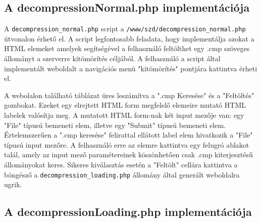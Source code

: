 \documentclass[oneside,titlepage,12pt,a4paper]{report}
\begin{document}
\subsection{A decompressionNormal.php implementációja}

A \texttt{decompression\_normal.php} script a \texttt{/www/szd/decompression\_normal.php} útvonalon érhető el. A script legfontosabb feladata, hogy implementálja azokat a HTML elemeket amelyek segítségével a felhasználó feltölthet egy .cmp szöveges állományt a szerverre kitömörítés céljából. A felhasználó a script által implementált weboldalt a navigációs menü "kitömörítés" pontjára kattintva érheti el. 
\par A webolalon található táblázat üres leszámítva a ".cmp Keresése" és a "Feltöltés" gombokat. Ezeket egy elrejtett HTML form megfelelő elemeire mutató HTML labelek valósítja meg. A mutatott HTML form-nak két input mezője van: egy "File" típusú bemeneti elem, illetve egy "Submit" típusú bemeneti elem. Értelemszerűen a ".cmp keresése" felirattal ellátott label elem hivatkozik a "File" típusú input mezőre. A felhasználó erre az elemre kattintva egy felugró ablakot talál, amely az input mező paramétereinek köszönhetően csak .cmp kiterjesztésű állományokat keres. Sikeres kiválasztás esetén a "Feltölt" cellára kattintva a böngésző a \texttt{decompression\_loading.php} állomány által generált weboldalra ugrik. 

\subsection{A decompressionLoading.php implementációja}
\end{document}
